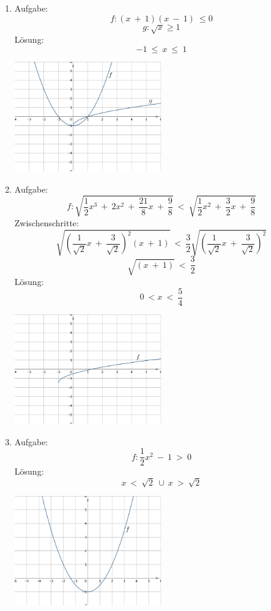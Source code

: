 \begin{enumerate}
	\item Aufgabe:
					\[f : (x \ + \ 1)(x \ - \ 1) \ \leq 0\]
					\[g : \sqrt x \geq 1 \]
				L\"osung:
					\[-1 \ \leq \ x \ \leq \ 1\]
					\begin{center}
						\includegraphics[width=0.5\textwidth]{img/Aufgaben/Analytisch/A1.PNG}
					\end{center}
	\item Aufgabe:
					\[f : \sqrt{\frac 1 2 x^3 \ + \ 2x^2 \ + \ \frac {21} 8 x \ + \ \frac 9 8} \ < \ \sqrt{\frac 1 2 x^2 \ + \ \frac 3 2 x \ + \ \frac 9 8 } \]
				Zwischenschritte: 
	  			\[ \sqrt{ (\frac 1 {\sqrt 2} x \ + \ \frac 3 {\sqrt 2})^2 ( x \ + \ 1)} \ < \ \frac 3 2 \sqrt{(\frac 1	{\sqrt 2} x \ + \ \frac 3 {\sqrt 2})^2}\]
	  			\[\sqrt {(x \ + \ 1)} \ < \ \frac 3 2\]
	  		L\"osung:
	  			\[0 \ < x \ < \ \frac 5 4\]
	  			\begin{center}
						\includegraphics[width=0.5\textwidth]{img/Aufgaben/Analytisch/A2.PNG}
					\end{center}
	\item Aufgabe:
					\[f : \frac 1 2 x^2 \ - \ 1 \ > \ 0\]
				L\"osung:
					\[x \ < \ \sqrt 2 \ \cup \ x \ > \ \sqrt 2\]
					\begin{center}
						\includegraphics[width=0.5\textwidth]{img/Aufgaben/Analytisch/A3.PNG}

\end{center}
\end{enumerate}
